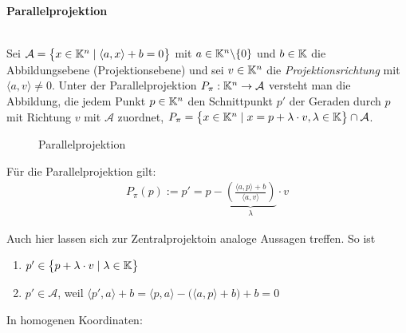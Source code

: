   \textbf{Parallelprojektion}

  \begin{defi} \ \\
    Sei $\mathcal{A}=\big\{ x \in \mathbb K^n \mid \langle a,x \rangle + b = 0 \big\}$ mit $a \in \mathbb K^n \backslash\{0\}$ und $b\in \mathbb K$ die 
    Abbildungsebene (Projektionsebene) und    sei $v\in \mathbb K^n$ die \textit{Projektionsrichtung} mit $\langle a,v \rangle \neq 0$. 
    Unter der Parallelprojektion $P_\pi: \mathbb K^n \rightarrow \mathcal{A}$ versteht man die Abbildung, die jedem Punkt $p\in \mathbb K^n$ den 
    Schnittpunkt $p'$ der Geraden durch $p$ mit Richtung $v$ mit $\mathcal{A}$ zuordnet, 
    $P_\pi = \big\{ x\in\mathbb K^n \mid x=p+\lambda \cdot v, \lambda \in \mathbb K \big\} \cap \mathcal{A}$.
  \end{defi}


  \begin{figure}[h]
    
    \caption{Parallelprojektion}
  \end{figure}


  \begin{thm}
    Für die Parallelprojektion gilt:
    \begin{align*}
      P_\pi(p) := p' = p - \underbrace{\left( \frac{\langle a,p \rangle + b}{\langle a,v \rangle} \right)}_{\lambda} \cdot v
    \end{align*}
  \end{thm}

  \begin{bem}
    Auch hier lassen sich zur Zentralprojektoin analoge Aussagen treffen. So ist
    \begin{enumerate}
      \item $p'\in \big\{ p + \lambda\cdot v \mid \lambda \in \mathbb K \big\}$ 
      \item $p'\in \mathcal{A}$, weil $\langle p',a \rangle + b = \langle p,a \rangle - \big( \langle a,p \rangle + b \big) + b = 0$
    \end{enumerate}
  \end{bem}

  In homogenen Koordinaten: \par

